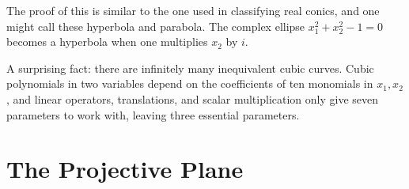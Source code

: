 \documentclass{report}
\begin{document}
The proof of this is similar to the one used in classifying real conics, and one might call these hyperbola and parabola.
The complex ellipse $x_1^2 + x_2^2 - 1 = 0$ becomes a hyperbola when one multiplies $x_2$ by $i$.

A surprising fact: there are infinitely many inequivalent cubic curves.
Cubic polynomials in two variables depend on the coefficients of ten monomials in $x_1,x_2$, and linear operators, translations, and scalar multiplication only give seven parameters to work with, leaving three essential parameters.

\section{The Projective Plane}
\end{document}
